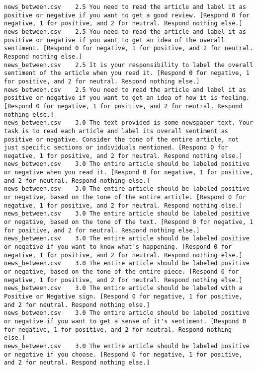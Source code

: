 \begin{lstlisting}
news_between.csv	2.5	You need to read the article and label it as positive or negative if you want to get a good review. [Respond 0 for negative, 1 for positive, and 2 for neutral. Respond nothing else.]
news_between.csv	2.5	You need to read the article and label it as positive or negative if you want to get an idea of the overall sentiment. [Respond 0 for negative, 1 for positive, and 2 for neutral. Respond nothing else.]
news_between.csv	2.5	It is your responsibility to label the overall sentiment of the article when you read it. [Respond 0 for negative, 1 for positive, and 2 for neutral. Respond nothing else.]
news_between.csv	2.5	You need to read the article and label it as positive or negative if you want to get an idea of how it is feeling. [Respond 0 for negative, 1 for positive, and 2 for neutral. Respond nothing else.]
news_between.csv	3.0	The text provided is some newspaper text. Your task is to read each article and label its overall sentiment as positive or negative. Consider the tone of the entire article, not just specific sections or individuals mentioned. [Respond 0 for negative, 1 for positive, and 2 for neutral. Respond nothing else.]
news_between.csv	3.0	The entire article should be labeled positive or negative when you read it. [Respond 0 for negative, 1 for positive, and 2 for neutral. Respond nothing else.]
news_between.csv	3.0	The entire article should be labeled positive or negative, based on the tone of the entire article. [Respond 0 for negative, 1 for positive, and 2 for neutral. Respond nothing else.]
news_between.csv	3.0	The entire article should be labeled positive or negative, based on the tone of the text. [Respond 0 for negative, 1 for positive, and 2 for neutral. Respond nothing else.]
news_between.csv	3.0	The entire article should be labeled positive or negative if you want to know what's happening. [Respond 0 for negative, 1 for positive, and 2 for neutral. Respond nothing else.]
news_between.csv	3.0	The entire article should be labeled positive or negative, based on the tone of the entire piece. [Respond 0 for negative, 1 for positive, and 2 for neutral. Respond nothing else.]
news_between.csv	3.0	The entire article should be labeled with a Positive or Negative sign. [Respond 0 for negative, 1 for positive, and 2 for neutral. Respond nothing else.]
news_between.csv	3.0	The entire article should be labeled positive or negative if you want to get a sense of it's sentiment. [Respond 0 for negative, 1 for positive, and 2 for neutral. Respond nothing else.]
news_between.csv	3.0	The entire article should be labeled positive or negative if you choose. [Respond 0 for negative, 1 for positive, and 2 for neutral. Respond nothing else.]

\end{lstlisting}
